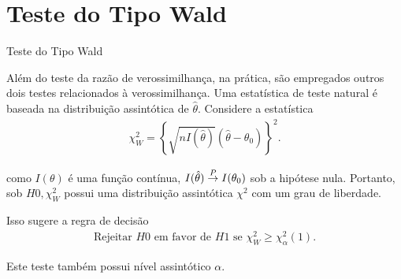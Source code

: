 \documentclass[12pt]{beamer}
\begin{document}
\section{Teste do Tipo Wald}
\begin{frame}{Teste do Tipo Wald}
\begin{block}{}
\justifying
Além do teste da razão de verossimilhança, na prática, são empregados outros dois testes relacionados à verossimilhança. Uma estatística de teste natural é baseada na distribuição assintótica de $\hat{\theta}$. Considere a estatística
\begin{align*}
    \chi^2_W = \left\{\sqrt{nI(\hat{\theta})}(\hat{\theta} - \theta_0)\right\}^2.
\end{align*}

como $I(\theta)$ é uma função contínua, $I(\hat{\theta}) \overset{P}{\rightarrow} I(\theta_0)$ sob a hipótese nula. Portanto, sob $H0, \chi^2_W$ possui uma distribuição assintótica $\chi^2$ com um grau de liberdade. 
\end{block}
\pause
\begin{block}{}
\justifying
Isso sugere a regra de decisão
\begin{align}\label{6.3.14}
    \text{Rejeitar } H0 \text{ em favor de } H1 \text{ se } \chi^2_W \geq \chi^2_\alpha(1).
\end{align}

Este teste também possui nível assintótico $\alpha.$
\end{block}
\end{frame}

\begin{frame}{}
\end{frame}
\end{document}
